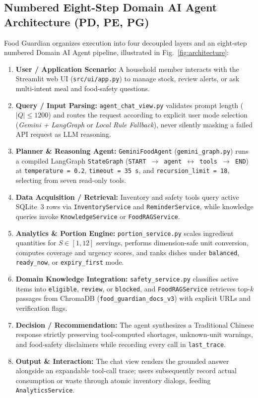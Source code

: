 \documentclass[conference]{IEEEtran}
\begin{document}
\subsection{Numbered Eight-Step Domain AI Agent Architecture (PD, PE, PG)}
Food Guardian organizes execution into four decoupled layers and an eight-step numbered Domain AI Agent pipeline, illustrated in Fig.~\ref{fig:architecture}:
\begin{enumerate}
    \item[\textbf{(1)}] \textbf{User / Application Scenario:} A household member interacts with the Streamlit web UI (\texttt{src/ui/app.py}) to manage stock, review alerts, or ask multi-intent meal and food-safety questions.
    \item[\textbf{(2)}] \textbf{Query / Input Parsing:} \texttt{agent\_chat\_view.py} validates prompt length ($|Q| \le 1200$) and routes the request according to explicit user mode selection (\emph{Gemini + LangGraph} or \emph{Local Rule Fallback}), never silently masking a failed API request as LLM reasoning.
    \item[\textbf{(3)}] \textbf{Planner \& Reasoning Agent:} \texttt{GeminiFoodAgent} (\texttt{gemini\_graph.py}) runs a compiled LangGraph \texttt{StateGraph} (\texttt{START $\rightarrow$ agent $\leftrightarrow$ tools $\rightarrow$ END}) at \texttt{temperature = 0.2}, \texttt{timeout = 35~s}, and \texttt{recursion\_limit = 18}, selecting from seven read-only tools.
    \item[\textbf{(4)}] \textbf{Data Acquisition / Retrieval:} Inventory and safety tools query active SQLite~3 rows via \texttt{InventoryService} and \texttt{ReminderService}, while knowledge queries invoke \texttt{KnowledgeService} or \texttt{FoodRAGService}.
    \item[\textbf{(5)}] \textbf{Analytics \& Portion Engine:} \texttt{portion\_service.py} scales ingredient quantities for $S \in [1, 12]$ servings, performs dimension-safe unit conversion, computes coverage and urgency scores, and ranks dishes under \texttt{balanced}, \texttt{ready\_now}, or \texttt{expiry\_first} mode.
    \item[\textbf{(6)}] \textbf{Domain Knowledge Integration:} \texttt{safety\_service.py} classifies active items into \texttt{eligible}, \texttt{review}, or \texttt{blocked}, and \texttt{FoodRAGService} retrieves top-$k$ passages from ChromaDB (\texttt{food\_guardian\_docs\_v3}) with explicit URLs and verification flags.
    \item[\textbf{(7)}] \textbf{Decision / Recommendation:} The agent synthesizes a Traditional Chinese response strictly preserving tool-computed shortages, unknown-unit warnings, and food-safety disclaimers while recording every call in \texttt{last\_trace}.
    \item[\textbf{(8)}] \textbf{Output \& Interaction:} The chat view renders the grounded answer alongside an expandable tool-call trace; users subsequently record actual consumption or waste through atomic inventory dialogs, feeding \texttt{AnalyticsService}.
\end{enumerate}
\end{document}
